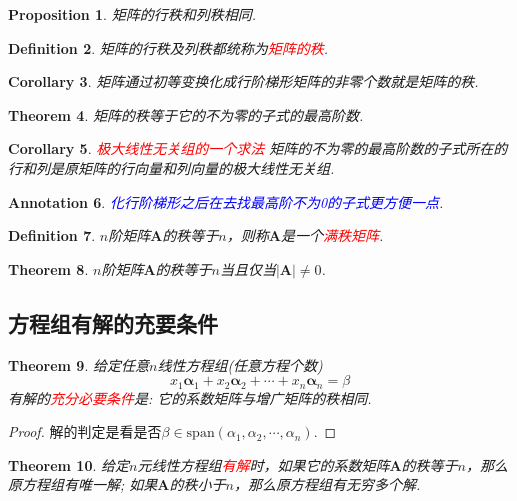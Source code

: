 \documentclass{article}
\newtheorem{theorem}{Theorem}[section]
\newtheorem{corollary}[theorem]{Corollary}
\newtheorem{proposition}[theorem]{Proposition}
\newtheorem{definition}[theorem]{Definition}
\newtheorem{annotation}[theorem]{Annotation}
\newcommand{\vect}[1]{\mathbf{#1}} %
\newcommand{\mbf}[1]{\bm{#1}}
\newcommand{\redt}[1]{\textcolor{red}{#1}}
\newcommand{\bluet}[1]{\textcolor{blue}{#1}}
\begin{document}
\begin{proposition}
\rm 矩阵的行秩和列秩相同.
\end{proposition}

\begin{definition}
\rm 矩阵的行秩及列秩都统称为\redt{矩阵的秩}.
\end{definition}

\begin{corollary}
\rm 矩阵通过初等变换化成行阶梯形矩阵的非零个数就是矩阵的秩.
\end{corollary}

\begin{theorem}
\rm 矩阵的秩等于它的不为零的子式的最高阶数.
\end{theorem}


\begin{corollary}
\rm \redt{极大线性无关组的一个求法} 矩阵的不为零的最高阶数的子式所在的行和列是原矩阵的行向量和列向量的极大线性无关组.
\end{corollary}

\begin{annotation}
\rm \bluet{化行阶梯形之后在去找最高阶不为0的子式更方便一点}.
\end{annotation}


\begin{definition}
\rm $n$阶矩阵$\mbf{A}$的秩等于$n$，则称$\mbf{A}$是一个\redt{满秩矩阵}.
\end{definition}

\begin{theorem}
\rm $n$阶矩阵$\mbf{A}$的秩等于$n$当且仅当$|\mbf{A}| \neq 0$.
\end{theorem}

\subsection{方程组有解的充要条件}


\begin{theorem}
\rm 给定任意$n$线性方程组(任意方程个数)
$$
x_1 \vect{\alpha}_1 + x_2 \vect{\alpha}_2 + \cdots + x_n \vect{\alpha}_n = \beta
$$
有解的\redt{充分必要条件}是: 它的系数矩阵与增广矩阵的秩相同.
\end{theorem}

\begin{proof}
解的判定是看是否$\beta \in \text{span}(\alpha_1,\alpha_2,\cdots,\alpha_n)$. 
\end{proof}

\begin{theorem}
\rm 给定$n$元线性方程组\redt{有解}时，如果它的系数矩阵$\mbf{A}$的秩等于$n$，那么原方程组有唯一解; 如果$\mbf{A}$的秩小于$n$，那么原方程组有无穷多个解.
\end{theorem}
\end{document}
